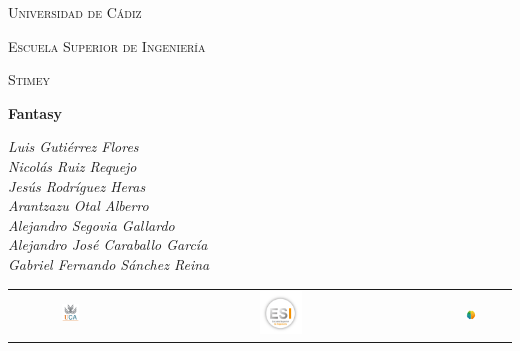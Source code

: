 \documentclass[12pt,letterpaper]{article}
\begin{document}
	
	\begin{titlepage}
		\centering
		\vspace{1cm}
		{\scshape\huge Universidad de Cádiz \par}
		\vspace{1cm}
		{\scshape\LARGE Escuela Superior de Ingeniería\par}
		\vspace{1cm}
		{\scshape\Large{Stimey}\par}
		\vspace{1cm}
		{\Huge\bfseries Fantasy\par}
		\vspace{1cm}
		{\Large\itshape Luis Gutiérrez Flores\\
			Nicolás Ruiz Requejo\\
			Jesús Rodríguez Heras\\
			Arantzazu Otal Alberro\\
			Alejandro Segovia Gallardo\\
			Alejandro José Caraballo García\\
			Gabriel Fernando Sánchez Reina\par}
		\vspace{2.5cm}
		\begin{table}[htb]
			\centering
			\begin{tabular}{ccc}
				\includegraphics[width=0.15\textwidth]{UCA.png}\par\vspace{1.2cm} & \includegraphics[width=0.15\textwidth]{ESI.png}\par\vspace{1.2cm} & \includegraphics[width=0.15\textwidth]{Stimey.png}\par\vspace{1.2cm}
			\end{tabular}
		\end{table}
		
		
		
	\end{titlepage}
\end{document}
